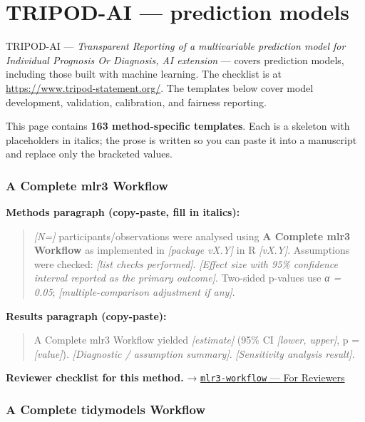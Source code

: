 \documentclass[
]{article}
\author{}
\date{\vspace{-2.5em}}
\begin{document}
\section{TRIPOD-AI --- prediction
models}\label{tripod-ai-prediction-models}

TRIPOD-AI --- \emph{Transparent Reporting of a multivariable prediction
model for Individual Prognosis Or Diagnosis, AI extension} --- covers
prediction models, including those built with machine learning. The
checklist is at \url{https://www.tripod-statement.org/}. The templates
below cover model development, validation, calibration, and fairness
reporting.

This page contains \textbf{163 method-specific templates}. Each is a
skeleton with placeholders in italics; the prose is written so you can
paste it into a manuscript and replace only the bracketed values.

\subsubsection{A Complete mlr3 Workflow}\label{a-complete-mlr3-workflow}

\textbf{Methods paragraph (copy-paste, fill in italics):}

\begin{quote}
\emph{{[}N={]}} participants/observations were analysed using \textbf{A
Complete mlr3 Workflow} as implemented in \emph{{[}package vX.Y{]}} in R
\emph{{[}vX.Y{]}}. Assumptions were checked: \emph{{[}list checks
performed{]}}. \emph{{[}Effect size with 95\% confidence interval
reported as the primary outcome{]}}. Two-sided p-values use \emph{α =
0.05}; \emph{{[}multiple-comparison adjustment if any{]}}.
\end{quote}

\textbf{Results paragraph (copy-paste):}

\begin{quote}
A Complete mlr3 Workflow yielded \emph{{[}estimate{]}} (95\% CI
\emph{{[}lower, upper{]}}, p = \emph{{[}value{]}}). \emph{{[}Diagnostic
/ assumption summary{]}}. \emph{{[}Sensitivity analysis result{]}}.
\end{quote}

\textbf{Reviewer checklist for this method.} →
\href{../chapters/13-ml/mlr3-workflow.Rmd\#for-reviewers}{\texttt{mlr3-workflow}
--- For Reviewers}

\subsubsection{A Complete tidymodels
Workflow}\label{a-complete-tidymodels-workflow}
\end{document}
